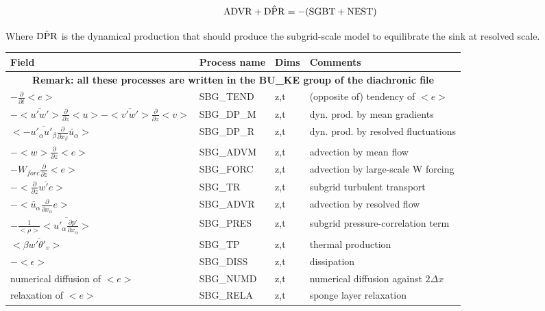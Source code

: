 \begin{displaymath}
{\rm ADVR}+\hat{\rm DPR} = -({\rm SGBT+NEST})
\end{displaymath}

Where $\hat{\rm DPR}$ is the dynamical production that should produce
the subgrid-scale model to equilibrate the sink at resolved scale.



\begin{longtable}[c]{|p{}|p{}|p{}|p{}|}
\hline
Field & Process name & Dims & Comments \\
\hline \hline
\endhead
\multicolumn{4}{|c|}{\textbf{Remark: all these processes are written in the BU\_KE group of the diachronic file}} \\
\hline
\endfoot
$-\frac{\partial }{\partial t}<e>$             & SBG\_TEND & z,t & (opposite of) tendency of $<e>$ \\\hline
$-<\overline{u'w'}>\frac{\partial }{\partial z}<u>-<\overline{v'w'}>\frac{\partial }{\partial z}<v>$ & SBG\_DP\_M & z,t & dyn. prod. by mean gradients \\\hline
$<-\overline{u'_\alpha u'_\beta}\frac{\partial}{\partial x_\beta}\tilde{u_\alpha}>$ & SBG\_DP\_R & z,t & dyn. prod. by resolved fluctuations \\\hline
$-<w>\frac{\partial}{\partial z}<e>$           & SBG\_ADVM & z,t & advection by mean flow\\\hline
$-W_{forc}\frac{\partial}{\partial z}<e>$      & SBG\_FORC & z,t & advection by large-scale W forcing\\\hline
$-<\frac{\partial}{\partial z}\overline{w'e}>$ & SBG\_TR   & z,t & subgrid turbulent transport\\\hline
$-<\tilde{u_\alpha}\frac{\partial}{\partial x_\alpha}e>$ & SBG\_ADVR & z,t & advection by resolved flow\\\hline
$- \frac{1}{<\rho>}<\overline{u'_\alpha \frac{\partial p'}{\partial x_\alpha}}>$& SBG\_PRES & z,t & subgrid pressure-correlation term\\\hline
$<\beta  \overline{w'\theta'_v}>$              & SBG\_TP   & z,t & thermal production \\\hline
$-<\epsilon>$                                  & SBG\_DISS & z,t & dissipation \\\hline
{\rm numerical diffusion of } $<e>$            & SBG\_NUMD & z,t & numerical diffusion against $2\Delta x$ \\\hline
{\rm relaxation of }$<e>$                      & SBG\_RELA & z,t & sponge layer relaxation \\\hline

\end{longtable}
